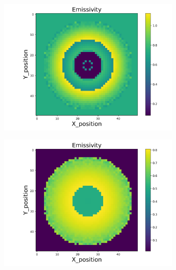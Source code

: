 \begin{figure}[p]
\begin{minipage}{\textwidth}
        \centering
        \begin{subfigure}{0.325\textwidth}
            \centering
            \includegraphics[width=\textwidth]{figures/raw_data/25/linear/emi_cal.jpg}
        \end{subfigure}
        \begin{subfigure}{0.325\textwidth}
            \centering
            \includegraphics[width=\textwidth]{figures/raw_data/26/linear/emi_cal.jpg}
        \end{subfigure}
        \begin{subfigure}{0.325\textwidth}
            \centering

\end{subfigure}
\end{minipage}
\end{figure}
